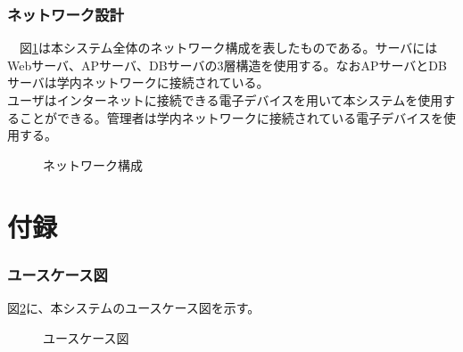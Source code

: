 \documentclass[a4j]{jarticle}
\begin{document}
\section{ネットワーク設計}
　図\ref{network:networktest}は本システム全体のネットワーク構成を表したものである。サーバにはWebサーバ、APサーバ、DBサーバの3層構造を使用する。なおAPサーバとDBサーバは学内ネットワークに接続されている。\\
ユーザはインターネットに接続できる電子デバイスを用いて本システムを使用することができる。管理者は学内ネットワークに接続されている電子デバイスを使用する。
\begin{figure}[H]
\begin{center}
\caption{ネットワーク構成}
\label{network:networktest}
\end{center}
\end{figure}




% 
%
%
%
\newpage
\appendix
\part*{付録}

\setcounter{section}{0} %
\renewcommand{\thesection}{\Alph{section}} %
\setcounter{figure}{0} %
\renewcommand{\thefigure}{\Alph{section}}


\section{ユースケース図}
図\ref{UseCase:UseCasetest}に、本システムのユースケース図を示す。
\begin{figure}[H]
\begin{center}
\caption{ユースケース図}
\label{UseCase:UseCasetest}
\end{center}
\end{figure}
\end{document}
